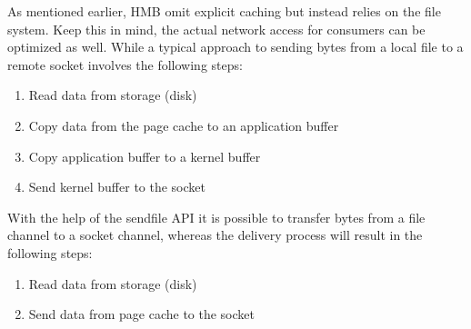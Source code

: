 As mentioned earlier, HMB omit explicit caching but instead relies on the file system.
Keep this in mind, the actual network access for consumers can be optimized as well.
While a typical approach to sending bytes from a local file to a remote
socket involves the following steps: 
\begin{enumerate}
  \item Read data from storage (disk)
  \item Copy data from the page cache to an application buffer
  \item Copy application buffer to a kernel buffer
  \item Send kernel buffer to the socket
\end{enumerate}

With the help of the sendfile API  it is possible to 
transfer bytes from a file channel to a socket channel, whereas the delivery process will result in the following steps:

\begin{enumerate}
  \item Read data from storage (disk)
  \item Send data from page cache to the socket
\end{enumerate}


